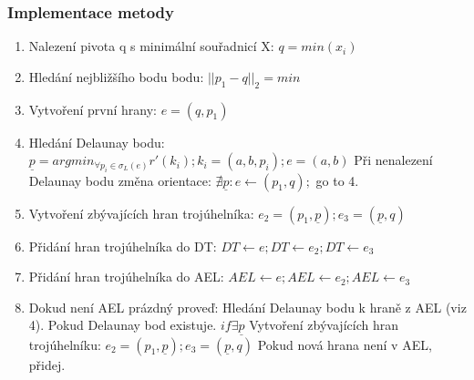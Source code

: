 \documentclass[a4paper, 12pt]{article}
\begin{document}
\subsubsection{Implementace metody}
\begin{enumerate}
\item Nalezení pivota q s minimální souřadnicí X:  $ q = min(x_i) $ 
\item Hledání nejbližšího bodu bodu: $ ||p_1 - q||_2 = min  $
\item Vytvoření první hrany: $ e = (q, p_1) $ 
\item Hledání Delaunay bodu: $ \underline{p} = argmin_{\forall p_i \in \sigma_L (e)} r'(k_i); k_i = (a, b, p_i); e = (a, b)$ 
\subitem Při nenalezení Delaunay bodu změna orientace: $ \nexists \underline{p} : e \leftarrow (p_1, q);$ go to 4. 
\item Vytvoření zbývajících hran trojúhelníka: $ e_2 = (p_1,  \underline{p}); e_3 = ( \underline{p} , q) $
\item Přidání hran trojúhelníka do DT:  $ DT \leftarrow e; DT \leftarrow e_2; DT \leftarrow e_3  $  
\item Přidání hran trojúhelníka do AEL:  $ AEL \leftarrow e; AEL \leftarrow e_2; AEL \leftarrow e_3  $  
\item Dokud není AEL prázdný proveď:
\subitem Hledání Delaunay bodu k hraně z AEL (viz 4).
\subitem Pokud Delaunay bod existuje. $ if \exists  \underline{p}$
\subsubitem Vytvoření zbývajících hran trojúhelníku:   $ e_2 = (p_1,  \underline{p}); e_3 = ( \underline{p} , q) $
\subsubitem Pokud nová hrana není v AEL, přidej.
\end{enumerate}
\end{document}
